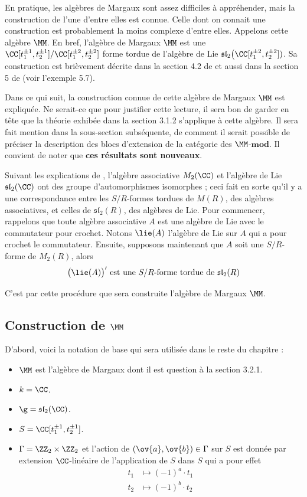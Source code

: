 En pratique, les algèbres de Margaux sont assez difficiles à appréhender, mais la construction de l'une d'entre elles est connue. Celle dont on connait une construction est probablement la moins complexe d'entre elles. Appelons cette algèbre $\MM$. En bref, l'algèbre de Margaux $\MM$ est une $\CC[t_1^{\pm 1},t_2^{\pm 1}] / \CC[t_1^{\pm 2},t_2^{\pm 2}]$ forme tordue de l'algèbre de Lie $\mathfrak{sl}_2\big(\CC[t_1^{\pm 2},t_2^{\pm 2}])$. Sa construction est brièvement décrite dans la section 4.2 de \cite{LPtfa} et aussi dans la section 5 de \cite{GPmar} (voir l'exemple 5.7). 

Dans ce qui suit, la construction connue de cette algèbre de Margaux $\MM$ est expliquée. Ne serait-ce que pour justifier cette lecture, il sera bon de garder en tête que la théorie exhibée dans la section 3.1.2 s'applique à cette algèbre. Il sera fait mention dans la sous-section subséquente, de comment il serait possible de préciser la description des blocs d'extension de la catégorie des $\MM$-$\mathbf{mod}$. Il convient de noter que \textbf{ces résultats sont nouveaux}.

Suivant les explications de \cite{LPtfa}, l'algèbre associative $M_2(\CC)$ et l'algèbre de Lie $\mathfrak{sl}_2(\CC)$ ont des groupe d'automorphismes isomorphes ; ceci fait en sorte qu'il y a une correspondance entre les $S/R$-formes tordues de $M(R)$, des algèbres associatives, et celles de $\mathfrak{sl}_2(R)$, des algèbres de Lie. Pour commencer, rappelons que toute algèbre associative $A$ est une algèbre de Lie avec le commutateur pour crochet. Notons $\lie(A)$ l'algèbre de Lie sur $A$ qui a pour crochet le commutateur. Ensuite, supposons maintenant que $A$ soit une $S/R$-forme de $M_2(R)$, alors
\begin{equation} \label{processussl2}
\big(\lie(A)\big)' \text{ est une } S/R \text{-forme tordue de } \mathfrak{sl}_2(R)
\end{equation}

C'est par cette procédure que sera construite l'algèbre de Margaux $\MM$.


%
\subsection{Construction de $\MM$}
D'abord, voici la notation de base qui sera utilisée dans le reste du chapitre :
\begin{itemize}
\item[\textbullet] $\MM$ est l'algèbre de Margaux dont il est question à la section 3.2.1.
\item[\textbullet] $k = \CC$.
\item[\textbullet] $\g = \mathfrak{sl}_2(\CC)$.
\item[\textbullet] $S = \CC[t_1^{\pm 1},t_2^{\pm 1}]$.
\item[\textbullet] $\Gamma = \ZZ_2 \times \ZZ_2$ et l'action de $(\ov{a},\ov{b}) \in \Gamma$ sur $S$ est donnée par extension $\CC$-linéaire de l'application de $S$ dans $S$ qui a pour effet
\begin{align*} 
t_1 &\mapsto (-1)^a \cdot t_1\\
t_2 &\mapsto (-1)^b \cdot t_2
\end{align*}
\end{itemize}

